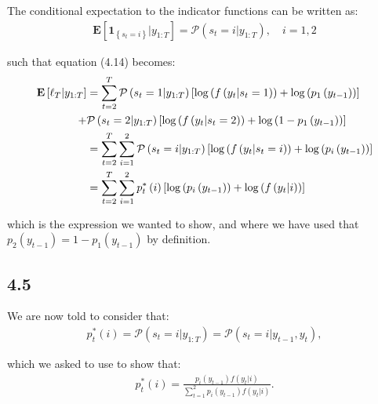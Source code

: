 \documentclass[11pt,a4paper,oneside]{article}
\newcommand{\lp}{\left(}
\newcommand{\rp}{\right)}
\newcommand{\rb}{\right]}
\newcommand{\lb}{\left[}
\newcommand{\lc}{\left\{}
\newcommand{\rc}{\right\}}
\newcommand{\ee}{\mathbf{E}}
\newcommand{\pp}{\mathcal{P}}
\newcommand{\ii}{\mathbf{1}}
\begin{document}
The conditional expectation to the indicator functions can be written as:
\begin{align}
    \ee\lb \ii_{\lc s_t = i \rc} \vert y_{1:T}\rb = \pp\lp s_t = i\vert y_{1:T}\rp, \quad i = 1, 2
\end{align}

such that equation (4.14) becomes:
\begin{align}
    \ee\lb \ell_T \vert y_{1:T}\rb 
        &= \sum_{t=2}^T 
            \pp\lp s_t = 1\vert y_{1:T}\rp
            \lb 
                \log \lp f\lp y_t \vert s_t = 1\rp \rp + \log \lp p_1\lp y_{t-1}\rp \rp
            \rb
            \notag \\
            +&
            \pp\lp s_t = 2\vert y_{1:T}\rp
            \lb
                \log\lp f\lp y_t \vert s_t = 2\rp \rp + \log \lp 1 - p_1\lp y_{t-1}\rp \rp 
            \rb
        \notag \\
        &=  \sum_{t=2}^T 
            \sum_{i = 1}^2
            \pp\lp s_t = i\vert y_{1:T}\rp
            \lb 
                \log \lp f\lp y_t \vert s_t = i\rp \rp + \log \lp p_i\lp y_{t-1}\rp \rp
            \rb
        \notag \\
        &=  \sum_{t=2}^T 
            \sum_{i = 1}^2
            p_t^*\lp i\rp 
            \lb 
                \log \lp p_i\lp y_{t-1}\rp \rp +
                \log \lp f\lp y_t \vert i\rp \rp
            \rb
\end{align}

which is the expression we wanted to show, and where we have used that $p_2 \lp y_{t-1}\rp = 1 - p_1\lp y_{t-1}\rp$ by definition.

\subsection{4.5}
We are now told to consider that:
\begin{align}
    p_t^*\lp i\rp  = \pp\lp s_t = i\vert y_{1:T}\rp = \pp\lp s_t = i \vert y_{t-1}, y_t\rp,
\end{align}

which we asked to use to show that:
\begin{align}
    p_t^*\lp i \rp = \frac{p_i\lp y_{t-1}\rp f\lp y_t \vert i\rp }{\sum_{t=1}^2p_i\lp y_{t-1}\rp f\lp y_t\vert i\rp}.
\end{align}
\end{document}
